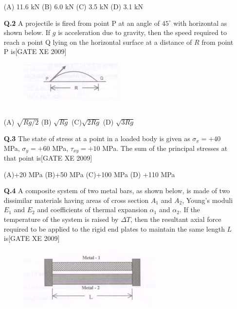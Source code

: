 \documentclass[journal,12pt,onecolumn]{IEEEtran}
\theoremstyle{remark}
\begin{document}
\begin{enumerate}
\begin{figure}[h]
\end{figure}

    (A) 11.6 kN \hfill
    (B) 6.0 kN \hfill
   (C) 3.5 kN \hfill
   (D) 3.1 kN


\vspace{1em}

\noindent
\item[\textbf{Q.2}] A projectile is fired from point P at an angle of $45^\circ$ with horizontal as shown below. If $g$ is acceleration due to gravity, then the speed required to reach a point Q lying on the horizontal surface at a distance of $R$ from point P is\hfill[GATE XE 2009]
\begin{figure}[h]
\centering
   \includegraphics[width=0.5\columnwidth]{figs/fig7.png}
    \end{figure}\\

   (A)  $\sqrt{Rg/2}$  \hfill
   (B)  $\sqrt{Rg}$  \hfill
    (C)$\sqrt{2Rg}$  \hfill 
    (D) $\sqrt{3Rg}$ \hfill


\vspace{1em}

\noindent
\item[\textbf{Q.3}] The state of stress at a point in a loaded body is given as $\sigma_x = +40$ MPa, $\sigma_y = +60$ MPa, $\tau_{xy} = +10$ MPa. The sum of the principal stresses at that point is\hfill[GATE XE 2009]

     (A)+20 MPa \hfill
     (B)+50 MPa  \hfill
     (C)+100 MPa \hfill
    (D) +110 MPa


\vspace{1em}

\noindent
\item[\textbf{Q.4}] A composite system of two metal bars, as shown below, is made of two dissimilar materials having areas of cross section $A_1$ and $A_2$, Young's moduli $E_1$ and $E_2$ and coefficients of thermal expansion $\alpha_1$ and $\alpha_2$. If the temperature of the system is raised by $\Delta T$, then the resultant axial force required to be applied to the rigid end plates to maintain the same length $L$ is\hfill[GATE XE 2009]
\begin{figure}[h]
    \centering
     \includegraphics[width=0.5\columnwidth]{figs/fig8.png}
\end{figure}


\end{enumerate}
\end{document}
